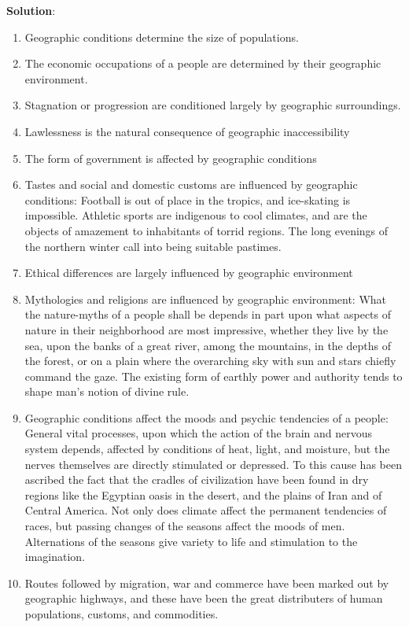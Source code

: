 \documentclass[
  openany]{book}
\newenvironment{solution}{ {\bfseries Solution}:}{}
\begin{document}
\begin{questions}
\begin{solution}
\begin{enumerate}
\item Geographic conditions determine the size of populations.
\item The economic occupations of a people are determined by their geographic environment.
\item Stagnation or progression are conditioned largely by geographic surroundings.
\item Lawlessness is the natural consequence of geographic inaccessibility
\item The form of government is affected by geographic conditions
\item Tastes and social and domestic customs are influenced by geographic conditions: Football is out of place in the tropics, and ice-skating is impossible. Athletic sports are indigenous to cool climates, and are the objects of amazement to inhabitants of torrid regions. The long evenings of the northern winter call into being suitable pastimes.
\item Ethical differences are largely influenced by geographic environment
\item Mythologies and religions are influenced by geographic environment: What the nature-myths of a people shall be depends in part upon what aspects of nature in their neighborhood are most impressive, whether they live by the sea, upon the banks of a great river, among the mountains, in the depths of the forest, or on a plain where the overarching sky with sun and stars chiefly command the gaze. The existing form of earthly power and authority tends to shape man's notion of divine rule.
\item Geographic conditions affect the moods and psychic tendencies of a people: General vital processes, upon which the action of the brain and nervous system depends, affected by conditions of heat, light, and moisture, but the nerves themselves are directly stimulated or depressed. To this cause has been ascribed the fact that the cradles of civilization have been found in dry regions like the Egyptian oasis in the desert, and the plains of Iran and of Central America. Not only does climate affect the permanent tendencies of races, but passing changes of the seasons affect the moods of men. Alternations of the seasons give variety to life and stimulation to the imagination.
\item Routes followed by migration, war and commerce have been marked out by geographic highways, and these have been the great distributers of human populations, customs, and commodities.
\end{enumerate}


\end{solution}
\end{questions}
\end{document}
